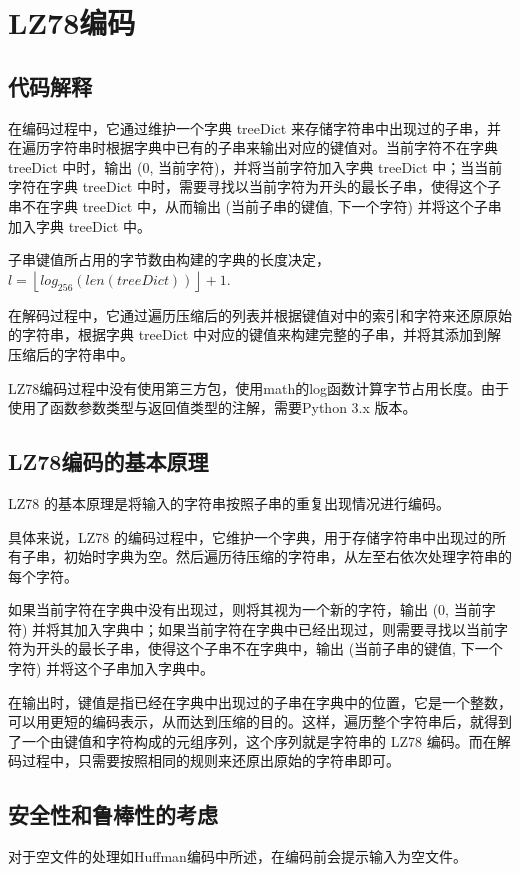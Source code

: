 \documentclass[12pt, a4paper]{ctexart}
\begin{document}
\section{LZ78编码}
    \subsection{代码解释}
    在编码过程中，它通过维护一个字典 treeDict 来存储字符串中出现过的子串，并在遍历字符串时根据字典中已有的子串来输出对应的键值对。当前字符不在字典 treeDict 中时，输出 (0, 当前字符)，并将当前字符加入字典 treeDict 中；当当前字符在字典 treeDict 中时，需要寻找以当前字符为开头的最长子串，使得这个子串不在字典 treeDict 中，从而输出 (当前子串的键值, 下一个字符) 并将这个子串加入字典 treeDict 中。

    子串键值所占用的字节数由构建的字典的长度决定，$l = \left \lfloor log_{256}(len(treeDict)) \right \rfloor  + 1$.
    
    在解码过程中，它通过遍历压缩后的列表并根据键值对中的索引和字符来还原原始的字符串，根据字典 treeDict 中对应的键值来构建完整的子串，并将其添加到解压缩后的字符串中。

    LZ78编码过程中没有使用第三方包，使用math的log函数计算字节占用长度。由于使用了函数参数类型与返回值类型的注解，需要Python 3.x 版本。

    \subsection{LZ78编码的基本原理}
    LZ78 的基本原理是将输入的字符串按照子串的重复出现情况进行编码。
    
    具体来说，LZ78 的编码过程中，它维护一个字典，用于存储字符串中出现过的所有子串，初始时字典为空。然后遍历待压缩的字符串，从左至右依次处理字符串的每个字符。
    
    如果当前字符在字典中没有出现过，则将其视为一个新的字符，输出 (0, 当前字符) 并将其加入字典中；如果当前字符在字典中已经出现过，则需要寻找以当前字符为开头的最长子串，使得这个子串不在字典中，输出 (当前子串的键值, 下一个字符) 并将这个子串加入字典中。
    
    在输出时，键值是指已经在字典中出现过的子串在字典中的位置，它是一个整数，可以用更短的编码表示，从而达到压缩的目的。这样，遍历整个字符串后，就得到了一个由键值和字符构成的元组序列，这个序列就是字符串的 LZ78 编码。而在解码过程中，只需要按照相同的规则来还原出原始的字符串即可。
    
    \subsection{安全性和鲁棒性的考虑}
    对于空文件的处理如Huffman编码中所述，在编码前会提示输入为空文件。
\end{document}

